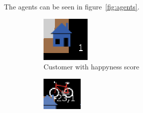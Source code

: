 The agents can be seen in figure~\ref{fig:agents}.
\begin{figure}
     \centering
     \begin{subfigure}[m]{0.1\textwidth}
         \centering
         \includegraphics[width=\textwidth]{sections/pics/cust_happy}
         \caption{Customer with happyness score}
     \end{subfigure}
     \hfill
     \begin{subfigure}[m]{0.1\textwidth}
         \centering
         \includegraphics[width=\textwidth]{sections/pics/del_on_its_way}

\end{subfigure}
\end{figure}
